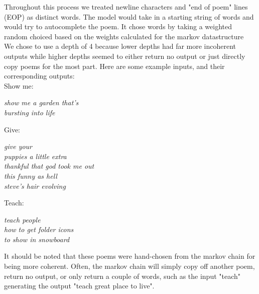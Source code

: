 \documentclass{article} %
\begin{document}
Throughout this process we treated newline characters and "end of poem" lines (EOP) as distinct words. The model would take in a starting string of
words and would try to autocomplete the poem. It chose words by taking a weighted random choiced based on the weights calculated for the markov
datastructure\\

We chose to use a depth of 4 because lower depths had far more incoherent outputs while higher depths seemed to either return no output
or just directly copy poems for the most part. Here are some example inputs, and their corresponding outputs:\\


Show me:
\begin{flushleft}
  \textit{
      \hspace{2em} show me a garden that's \\
      \hspace{2em} bursting into life
  }
\end{flushleft}

Give:
\begin{flushleft}
  \textit{
      \hspace{2em} give your \\
      \hspace{2em} puppies a little extra\\
      \hspace{2em} thankful that god took me out\\
      \hspace{2em} this funny as hell\\
      \hspace{2em} steve's hair evolving\\
  }
\end{flushleft}

 
 Teach:
 \begin{flushleft}
  \textit{
      \hspace{2em} teach people  \\
      \hspace{2em} how to get folder icons\\
      \hspace{2em} to show in snowboard\\
  }
\end{flushleft}
 
It should be noted that these poems were hand-chosen from the markov chain for being more coherent. Often, the markov chain will simply copy
off another poem, return no output, or only return a couple of words, such as the input "teach" generating the output "teach great place to live".\\
\end{document}
